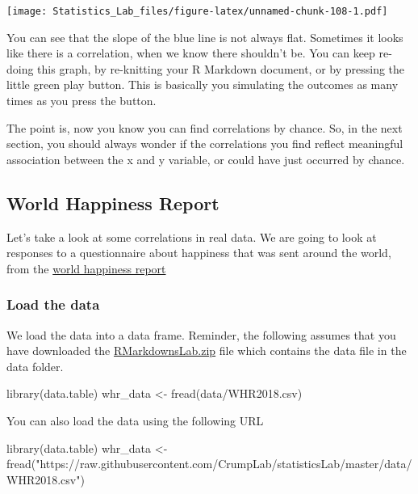 \documentclass[
]{book}
\newenvironment{Shaded}{\begin{snugshade}}{\end{snugshade}}
\newcommand{\FunctionTok}[1]{\textcolor[rgb]{0.00,0.00,0.00}{#1}}
\newcommand{\NormalTok}[1]{#1}
\newcommand{\OtherTok}[1]{\textcolor[rgb]{0.56,0.35,0.01}{#1}}
\newcommand{\StringTok}[1]{\textcolor[rgb]{0.31,0.60,0.02}{#1}}
\begin{document}
\texttt{[image: Statistics\_Lab\_files/figure-latex/unnamed-chunk-108-1.pdf]}

You can see that the slope of the blue line is not always flat. Sometimes it looks like there is a correlation, when we know there shouldn't be. You can keep re-doing this graph, by re-knitting your R Markdown document, or by pressing the little green play button. This is basically you simulating the outcomes as many times as you press the button.

The point is, now you know you can find correlations by chance. So, in the next section, you should always wonder if the correlations you find reflect meaningful association between the x and y variable, or could have just occurred by chance.

\hypertarget{world-happiness-report}{%
\subsection{World Happiness Report}\label{world-happiness-report}}

Let's take a look at some correlations in real data. We are going to look at responses to a questionnaire about happiness that was sent around the world, from the \href{http://worldhappiness.report}{world happiness report}

\hypertarget{load-the-data}{%
\subsubsection{Load the data}\label{load-the-data}}

We load the data into a data frame. Reminder, the following assumes that you have downloaded the \href{https://github.com/CrumpLab/statisticsLab/raw/master/RMarkdownsLab.zip}{RMarkdownsLab.zip} file which contains the data file in the data folder.

\begin{Shaded}
\begin{Highlighting}[]
\FunctionTok{library}\NormalTok{(data.table)}
\NormalTok{whr\_data }\OtherTok{\textless{}{-}} \FunctionTok{fread}\NormalTok{(}\StringTok{\textquotesingle{}data/WHR2018.csv\textquotesingle{}}\NormalTok{)}
\end{Highlighting}
\end{Shaded}

You can also load the data using the following URL

\begin{Shaded}
\begin{Highlighting}[]
\FunctionTok{library}\NormalTok{(data.table)}
\NormalTok{whr\_data }\OtherTok{\textless{}{-}} \FunctionTok{fread}\NormalTok{(}\StringTok{"https://raw.githubusercontent.com/CrumpLab/statisticsLab/master/data/WHR2018.csv"}\NormalTok{)}
\end{Highlighting}
\end{Shaded}
\end{document}

